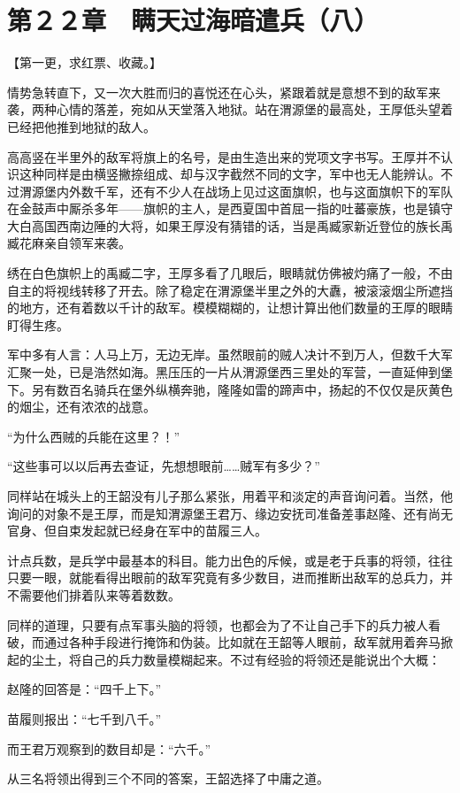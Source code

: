 \section{第２２章　瞒天过海暗遣兵（八）}

【第一更，求红票、收藏。】

情势急转直下，又一次大胜而归的喜悦还在心头，紧跟着就是意想不到的敌军来袭，两种心情的落差，宛如从天堂落入地狱。站在渭源堡的最高处，王厚低头望着已经把他推到地狱的敌人。

高高竖在半里外的敌军将旗上的名号，是由生造出来的党项文字书写。王厚并不认识这种同样是由横竖撇捺组成、却与汉字截然不同的文字，军中也无人能辨认。不过渭源堡内外数千军，还有不少人在战场上见过这面旗帜，也与这面旗帜下的军队在金鼓声中厮杀多年——旗帜的主人，是西夏国中首屈一指的吐蕃豪族，也是镇守大白高国西南边陲的大将，如果王厚没有猜错的话，当是禹臧家新近登位的族长禹臧花麻亲自领军来袭。

绣在白色旗帜上的禹臧二字，王厚多看了几眼后，眼睛就仿佛被灼痛了一般，不由自主的将视线转移了开去。除了稳定在渭源堡半里之外的大纛，被滚滚烟尘所遮挡的地方，还有着数以千计的敌军。模模糊糊的，让想计算出他们数量的王厚的眼睛盯得生疼。

军中多有人言：人马上万，无边无岸。虽然眼前的贼人决计不到万人，但数千大军汇聚一处，已是浩然如海。黑压压的一片从渭源堡西三里处的军营，一直延伸到堡下。另有数百名骑兵在堡外纵横奔驰，隆隆如雷的蹄声中，扬起的不仅仅是灰黄色的烟尘，还有浓浓的战意。

“为什么西贼的兵能在这里？！”

“这些事可以以后再去查证，先想想眼前……贼军有多少？”

同样站在城头上的王韶没有儿子那么紧张，用着平和淡定的声音询问着。当然，他询问的对象不是王厚，而是知渭源堡王君万、缘边安抚司准备差事赵隆、还有尚无官身、但自束发起就已经身在军中的苗履三人。

计点兵数，是兵学中最基本的科目。能力出色的斥候，或是老于兵事的将领，往往只要一眼，就能看得出眼前的敌军究竟有多少数目，进而推断出敌军的总兵力，并不需要他们排着队来等着数数。

同样的道理，只要有点军事头脑的将领，也都会为了不让自己手下的兵力被人看破，而通过各种手段进行掩饰和伪装。比如就在王韶等人眼前，敌军就用着奔马掀起的尘土，将自己的兵力数量模糊起来。不过有经验的将领还是能说出个大概：

赵隆的回答是：“四千上下。”

苗履则报出：“七千到八千。”

而王君万观察到的数目却是：“六千。”

从三名将领出得到三个不同的答案，王韶选择了中庸之道。

